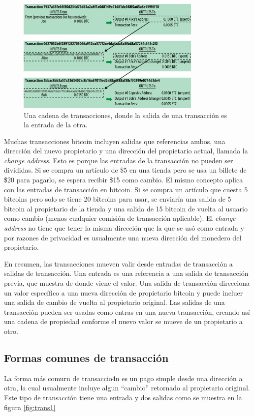 \documentclass[10pt,journal,compsoc]{IEEEtran}
\begin{document}
\begin{figure}[h]
    \center
    \includegraphics[width=9cm]{chain}
    \caption{Una cadena de transacciones, donde la salida de una transacción es la entrada de la otra.}
    \label{fig:chain}
\end{figure}

Muchas transacciones bitcoin incluyen salidas que referencias ambos, una dirección del nuevo propietario y una dirección del propietario actual, llamada la \emph{change address}. Esto es porque las entradas de la transacción no pueden ser divididas. Si se compra un artículo de \$5 en una tienda pero se usa un billete de \$20 para pagarlo, se espera recibir \$15 como cambio. El mismo concepto aplica con las entradas de transacción en bitcoin. Si se compra un artículo que cuesta 5 bitcoins pero solo se tiene 20 bitcoins para usar, se enviaría una salida de 5 bitcoin al propietario de la tienda y una salida de 15 bitcoin de vuelta al usuario como cambio (menos cualquier comisión de transacción aplicable). El \emph{change address} no tiene que tener la misma dirección que la que se usó como entrada y por razones de privacidad es usualmente una nueva dirección del monedero del propietario.

En resumen, las transacciones mueven valir desde entradas de transacción a salidas de transacción. Una entrada es una referencia a una salida de transacción previa, que muestra de donde viene el valor. Una salida de transacción direcciona un valor específico a una nueva dirección de propietario bitcoin y puede incluer una salida de cambio de vuelta al propietario original. Las salidas de una transacción pueden ser usadas como entras en una nueva transacción, creando así una cadena de propiedad conforme el nuevo valor se mueve de un propietario a otro. 

\subsection{Formas comunes de transacción}
La forma más comurn de transaccio4n es un pago simple desde una dirección a otra, la cual usualmente incluye algun ``cambio'' retornado al propietario original. Este tipo de transacción tiene una entrada y dos salidas como se muestra en la figura \ref{fig:trans1}    
\end{document}
